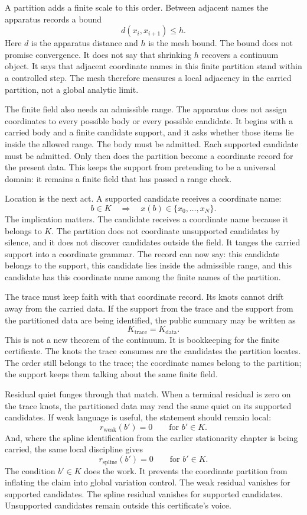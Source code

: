 A partition adds a finite scale to this order. Between adjacent names the
apparatus records a bound
\[
  d(x_i,x_{i+1}) \le h .
\]
Here \(d\) is the apparatus distance and \(h\) is the mesh bound. The bound
does not promise convergence. It does not say that shrinking \(h\) recovers a
continuum object. It says that adjacent coordinate names in this finite
partition stand within a controlled step. The mesh therefore measures a local
adjacency in the carried partition, not a global analytic limit.

The finite field also needs an admissible range. The apparatus does not assign
coordinates to every possible body or every possible candidate. It begins with
a carried body and a finite candidate support, and it asks whether those
items lie inside the allowed range. The body must be admitted. Each supported
candidate must be admitted. Only then does the partition become a coordinate
record for the present data. This keeps the support from pretending to be a
universal domain: it remains a finite field that has passed a range check.

Location is the next act. A supported candidate receives a coordinate name:
\[
  b \in K
  \quad \Longrightarrow \quad
  x(b) \in \{x_0,\ldots,x_N\}.
\]
The implication matters. The candidate receives a coordinate name because it
belongs to \(K\). The partition does not coordinate unsupported candidates by
silence, and it does not discover candidates outside the field. It tanges the carried support into a coordinate grammar. The record can now say:
this candidate belongs to the support, this candidate lies inside the
admissible range, and this candidate has this coordinate name among the
finite names of the partition.

The trace must keep faith with that coordinate record. Its knots cannot drift
away from the carried data. If the support from the trace and the support from
the partitioned data are being identified, the public summary may be written
as
\[
  K_{\mathrm{trace}} = K_{\mathrm{data}} .
\]
This is not a new theorem of the continuum. It is bookkeeping for the finite
certificate. The knots the trace consumes are the candidates the partition
locates. The order still belongs to the trace; the coordinate names belong to
the partition; the support keeps them talking about the same finite field.

Residual quiet funges through that match. When a terminal residual is zero
on the trace knots, the partitioned data may read the same quiet on its
supported candidates. If weak language is useful, the statement should remain
local:
\[
  r_{\mathrm{weak}}(b')=0
  \qquad \text{for } b' \in K .
\]
And, where the spline identification from the earlier stationarity chapter is
being carried, the same local discipline gives
\[
  r_{\mathrm{spline}}(b')=0
  \qquad \text{for } b' \in K .
\]
The condition \(b' \in K\) does the work. It prevents the coordinate
partition from inflating the claim into global variation control. The weak
residual vanishes for supported candidates. The spline residual vanishes for
supported candidates. Unsupported candidates remain outside this certificate's
voice.

